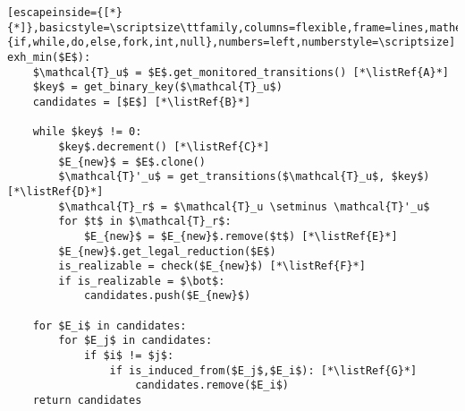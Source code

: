 \renewcommand{\ttdefault}{pcr}
\begin{lstlisting}[escapeinside={[*}{*]},basicstyle=\scriptsize\ttfamily,columns=flexible,frame=lines,mathescape=true,xleftmargin=5.0ex,keywordstyle=\textbf,morekeywords={if,while,do,else,fork,int,null},numbers=left,numberstyle=\scriptsize]
exh_min($E$):
	$\mathcal{T}_u$ = $E$.get_monitored_transitions() [*\listRef{A}*]
	$key$ = get_binary_key($\mathcal{T}_u$)
	candidates = [$E$] [*\listRef{B}*]
	
	while $key$ != 0:
		$key$.decrement() [*\listRef{C}*]
		$E_{new}$ = $E$.clone()
		$\mathcal{T}'_u$ = get_transitions($\mathcal{T}_u$, $key$) [*\listRef{D}*]
		$\mathcal{T}_r$ = $\mathcal{T}_u \setminus \mathcal{T}'_u$ 
		for $t$ in $\mathcal{T}_r$:
			$E_{new}$ = $E_{new}$.remove($t$) [*\listRef{E}*]
		$E_{new}$.get_legal_reduction($E$)
		is_realizable = check($E_{new}$) [*\listRef{F}*]
		if is_realizable = $\bot$:		
			candidates.push($E_{new}$)
	
	for $E_i$ in candidates:
		for $E_j$ in candidates:
			if $i$ != $j$:
				if is_induced_from($E_j$,$E_i$): [*\listRef{G}*]
					candidates.remove($E_i$)
	return candidates
\end{lstlisting}